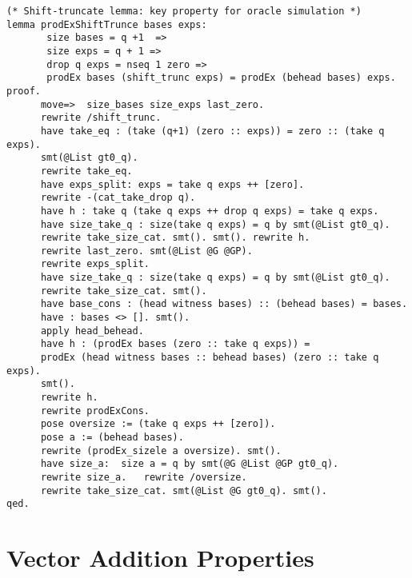 \begin{lstlisting}[style=easycrypt, caption=Proof of Shift-Truncate Property, breaklines=true, breakatwhitespace=true, frame=single, keepspaces=true]
(* Shift-truncate lemma: key property for oracle simulation *)
lemma prodExShiftTrunce bases exps:
       size bases = q +1  =>
       size exps = q + 1 =>
       drop q exps = nseq 1 zero =>
       prodEx bases (shift_trunc exps) = prodEx (behead bases) exps.
proof.
      move=>  size_bases size_exps last_zero.
      rewrite /shift_trunc.
      have take_eq : (take (q+1) (zero :: exps)) = zero :: (take q exps).
      smt(@List gt0_q).
      rewrite take_eq.
      have exps_split: exps = take q exps ++ [zero].  
      rewrite -(cat_take_drop q).
      have h : take q (take q exps ++ drop q exps) = take q exps. 
      have size_take_q : size(take q exps) = q by smt(@List gt0_q). 
      rewrite take_size_cat. smt(). smt(). rewrite h. 
      rewrite last_zero. smt(@List @G @GP).
      rewrite exps_split.
      have size_take_q : size(take q exps) = q by smt(@List gt0_q). 
      rewrite take_size_cat. smt().
      have base_cons : (head witness bases) :: (behead bases) = bases.
      have : bases <> []. smt(). 
      apply head_behead. 
      have h : (prodEx bases (zero :: take q exps)) =
      prodEx (head witness bases :: behead bases) (zero :: take q exps). 
      smt().
      rewrite h.
      rewrite prodExCons.
      pose oversize := (take q exps ++ [zero]).
      pose a := (behead bases).  
      rewrite (prodEx_sizele a oversize). smt().  
      have size_a:  size a = q by smt(@G @List @GP gt0_q).
      rewrite size_a.   rewrite /oversize. 
      rewrite take_size_cat. smt(@List @G gt0_q). smt().
qed.
\end{lstlisting}

\section{Vector Addition Properties}
\label{sec:vector-addition-proofs}

